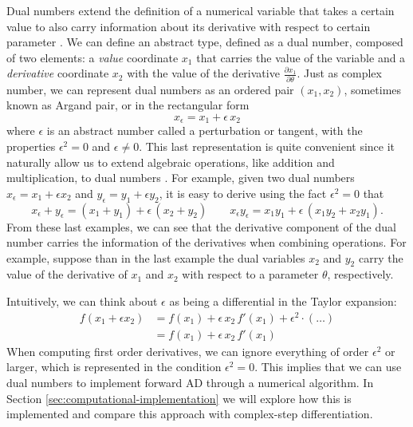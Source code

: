 Dual numbers extend the definition of a numerical variable that takes a certain value to also carry information about its derivative with respect to certain parameter \cite{clifford1871dualnumbers}. 
We can define an abstract type, defined as a dual number, composed of two elements: a \textit{value} coordinate $x_1$ that carries the value of the variable and a \textit{derivative} coordinate $x_2$ with the value of the derivative $\frac{\partial x_1}{\partial \theta}$. 
Just as complex number, we can represent dual numbers as an ordered pair $(x_1, x_2)$, sometimes known as Argand pair, or in the rectangular form 
\begin{equation}
 x_\epsilon = x_1 + \epsilon \, x_2
\end{equation}
where $\epsilon$ is an abstract number called a perturbation or tangent, with the properties $\epsilon^2 = 0$ and $\epsilon \neq 0$.
This last representation is quite convenient since it naturally allow us to extend algebraic operations, like addition and multiplication, to dual numbers \cite{Karczmarczuk2001}. 
For example, given two dual numbers $x_\epsilon = x_1 + \epsilon x_2$ and $y_\epsilon = y_1 + \epsilon y_2$, it is easy to derive using the fact $\epsilon^2=0$ that
\begin{equation}
 x_\epsilon + y_\epsilon = (x_1 + y_1) + \epsilon \, (x_2 + y_2)
 \qquad
 x_\epsilon y_\epsilon = x_1 y_1 + \epsilon \, (x_1 y_2 + x_2 y_1) .
\end{equation}
From these last examples, we can see that the derivative component of the dual number carries the information of the derivatives when combining operations.
For example, suppose than in the last example the dual variables $x_2$ and $y_2$ carry the value of the derivative of $x_1$ and $x_2$ with respect to a parameter $\theta$, respectively. 

Intuitively, we can think about $\epsilon$ as being a differential in the Taylor expansion:
\begin{align}
    f(x_1 + \epsilon x_2)
    &= 
    f(x_1)
    + 
    \epsilon \, x_2 \,  f'(x_1)
    + 
    \epsilon^2 \cdot ( \ldots ) \nonumber \\
    &= 
    f(x_1)
    + 
    \epsilon \, x_2 \,  f'(x_1)
    \label{eq:dual-number-function}
\end{align}
When computing first order derivatives, we can ignore everything of order $\epsilon^2$ or larger, which is represented in the condition $\epsilon^2 = 0$.
This implies that we can use dual numbers to implement forward AD through a numerical algorithm. 
In Section \ref{sec:computational-implementation} we will explore how this is implemented and compare this approach with complex-step differentiation. 

